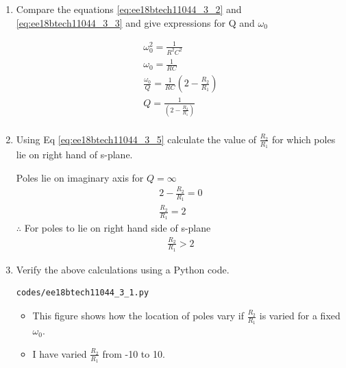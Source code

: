 \begin{enumerate}[label=\thesubsection.\arabic*.,ref=\thesubsection.\theenumi]
\item 
Compare the equations \ref{eq:ee18btech11044_3_2} and \ref{eq:ee18btech11044_3_3} and give expressions for Q and $\omega_0$

\solution
\begin{align}
    \omega_0^2 = \frac{1}{R^2C^2} \\
    \omega_0 = \frac{1}{RC} \label{eq:ee18btech11044_3_4} \\
    \frac{\omega_0}{Q} = \frac{1}{RC}(2 - \frac{R_2}{R_1}) \\
    Q = \frac{1}{(2 - \frac{R_2}{R_1})} \label{eq:ee18btech11044_3_5} \\
\end{align}
\item 
Using Eq \ref{eq:ee18btech11044_3_5} calculate the value of $\frac{R_2}{R_1}$ for which poles lie on right hand of s-plane.

\solution 

Poles lie on imaginary axis for $Q = \infty$
\begin{align}
    2 - \frac{R_2}{R_1} = 0 \\
    \frac{R_2}{R_1} = 2
\end{align}
$\therefore$ For poles to lie on right hand side of s-plane
\begin{align}
    \frac{R_2}{R_1} >2
\end{align}


\item
Verify the above calculations using a Python code.

\solution
\begin{lstlisting}
codes/ee18btech11044_3_1.py
\end{lstlisting}
\begin{itemize}
    \item This figure shows how the location of poles vary if $\frac{R_2}{R_1}$ is varied for a fixed $\omega_0$.
    \item I have varied $\frac{R_2}{R_1}$ from -10 to 10. 
\end{itemize}


\end{enumerate}

